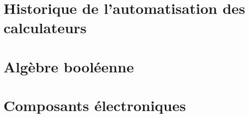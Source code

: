 \label{app:B}





\section[Historique des calculateurs]{Historique de l'automatisation des calculateurs}
\label{sec:B.1}


\vspace{2cm}






\section{Algèbre booléenne}
\label{sec:B.2}



\vspace{2cm}













\section{Composants électroniques}
\label{sec:B.3}
